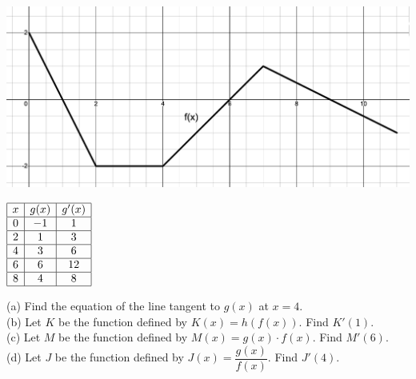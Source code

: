  \\
\begin{minipage}[t]{0.75\textwidth} \vspace{0pt}%
    \includegraphics[width = \textwidth]{Support/Chapter 1 Graphics/1.7-Graphic6.png}
\end{minipage} \hfill \begin{minipage}[t]{0.2\textwidth} \vspace{11pt}%
    \def\arraystretch{1.4}
    $\begin{array}{|c|c|c|}
        \hline
        x & g(x) & g'(x) \\ \hline
        0 & -1 & 1 \\ \hline
        2 & 1 & 3 \\ \hline
        4 & 3 & 6 \\ \hline
        6 & 6 & 12 \\ \hline
        8 & 4 & 8 \\
        \hline
    \end{array}$
\end{minipage} 

(a) Find the equation of the line tangent to $g(x)$ at $x = 4$. \\[11pt]
(b) Let $K$ be the function defined by $K(x) = h(f(x))$. Find $K'(1)$. \\[11pt]
(c) Let $M$ be the function defined by $M(x) = g(x) \cdot f(x)$. Find $M'(6)$. \\[11pt]
(d) Let $J$ be the function defined by $J(x) = \dfrac{g(x)}{f(x)}$. Find $J'(4)$. \\[11pt]

